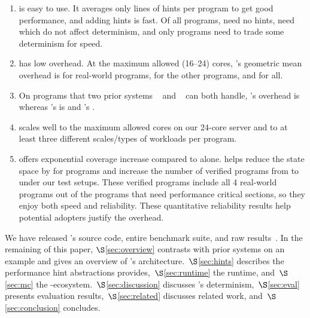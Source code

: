 \begin{enumerate}

\item \parrot is easy to use. It averages only \hintsperprog lines of hints
  per program to get good performance, and adding hints is fast.  Of all
  \nprog programs, \nprognohints need no hints, \nproglineuphints need
  \computes which do not affect determinism, and only \nprognondethints
  programs need \nondets to trade some determinism for speed.

\item \parrot has low overhead.  At the maximum allowed (16--24) cores, \parrot's
  geometric mean overhead is \meanrealoverhead for \nrealprog real-world programs,
  \meanbenchoverhead for the other \nbenchmarks programs, and \meanoverhead for all.

\item On \nprogcompared programs that two prior systems \dthreads~\cite{dthreads:sosp11}
  and \coredet~\cite{coredet:asplos10} can both handle, \parrot's overhead is \parrotcompoverhead whereas \dthreads's
  is \dthreadssyncoverhead and \coredet's \coredetoverhead.

\item \parrot scales well to the maximum allowed cores on our 24-core server and
  to at least three different scales/types of workloads per program.

\item \ecosys offers exponential coverage increase compared to \dbug alone.
  \parrot helps \dbug reduce the state space by \shrinkscale for
  \nprogshrink programs and increase the number of verified programs from
  \nprogverifieddbug to \nprogverifiedxxx under our test setups.
  These verified programs include all 4 real-world programs out of
  the \nprognondethints programs that need performance critical sections, so they
  enjoy both speed and reliability.
  These quantitative reliability results help potential \parrot adopters justify
  the overhead.

\end{enumerate}

We have released \parrot's source code, entire benchmark suite, and
raw results~\cite{Parrot:github}. In the remaining of this paper, $\S$\ref{sec:overview} contrasts \parrot with 
prior systems on an example and gives an overview of \parrot's 
architecture.~$\S$\ref{sec:hints} describes the performance hint abstractions \parrot
provides,~$\S$\ref{sec:runtime} the \parrot runtime, and~$\S$\ref{sec:mc} the
\parrot-\dbug ecosystem.~$\S$\ref{sec:discussion} discusses \parrot's determinism,~$\S$\ref{sec:eval}
presents evaluation results,~$\S$\ref{sec:related}
discusses related work, and~$\S$\ref{sec:conclusion} concludes.
